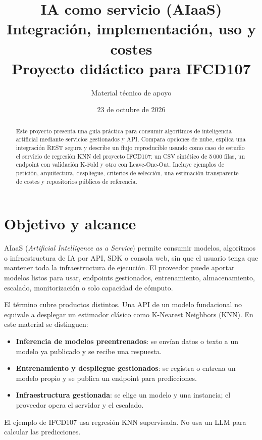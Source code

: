 \documentclass[11pt,a4paper]{article}
\title{\textbf{IA como servicio (AIaaS)}\\Integración, implementación, uso y costes\\[4pt]\large Proyecto didáctico para IFCD107}
\author{Material técnico de apoyo}
\date{23 de octubre de 2026}
\begin{document}
\maketitle
\begin{abstract}
Este proyecto presenta una guía práctica para consumir algoritmos de inteligencia artificial mediante servicios gestionados y API. Compara opciones de nube, explica una integración REST segura y describe un flujo reproducible usando como caso de estudio el servicio de regresión KNN del proyecto IFCD107: un CSV sintético de 5\,000 filas, un endpoint con validación K-Fold y otro con Leave-One-Out. Incluye ejemplos de petición, arquitectura, despliegue, criterios de selección, una estimación transparente de costes y repositorios públicos de referencia.
\end{abstract}
\tableofcontents
\newpage

\section{Objetivo y alcance}
AIaaS (\emph{Artificial Intelligence as a Service}) permite consumir modelos, algoritmos o infraestructura de IA por API, SDK o consola web, sin que el usuario tenga que mantener toda la infraestructura de ejecución. El proveedor puede aportar modelos listos para usar, endpoints gestionados, entrenamiento, almacenamiento, escalado, monitorización o solo capacidad de cómputo.

El término cubre productos distintos. Una API de un modelo fundacional no equivale a desplegar un estimador clásico como K-Nearest Neighbors (KNN). En este material se distinguen:
\begin{itemize}
  \item \textbf{Inferencia de modelos preentrenados}: se envían datos o texto a un modelo ya publicado y se recibe una respuesta.
  \item \textbf{Entrenamiento y despliegue gestionados}: se registra o entrena un modelo propio y se publica un endpoint para predicciones.
  \item \textbf{Infraestructura gestionada}: se elige un modelo y una instancia; el proveedor opera el servidor y el escalado.
\end{itemize}
El ejemplo de IFCD107 usa regresión KNN supervisada. No usa un LLM para calcular las predicciones.
\end{document}
